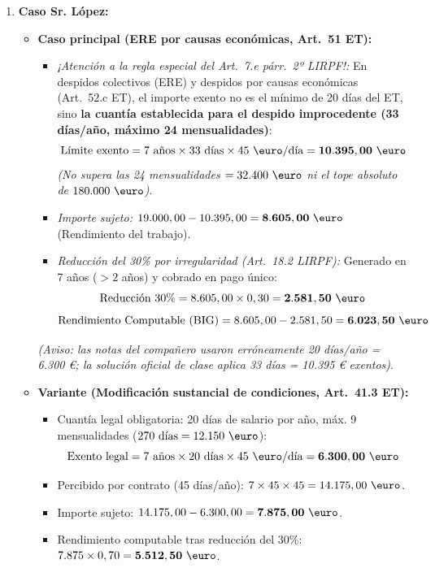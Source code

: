 \documentclass[11pt,a4paper,openany]{article}
\begin{document}
\begin{solucionBox}
\begin{enumerate}[label=\textbf{\arabic*.}]
    \item \textbf{Caso Sr. López:}
    \begin{itemize}
        \item \textbf{Caso principal (ERE por causas económicas, Art.~51 ET):}
        \begin{itemize}
            \item \textit{¡Atención a la regla especial del Art.~7.e párr.~2º LIRPF!:} En despidos colectivos (ERE) y despidos por causas económicas (Art.~52.c ET), el importe exento no es el mínimo de 20 días del ET, sino \textbf{la cuantía establecida para el despido improcedente (33 días/año, máximo 24 mensualidades)}:
            $$\text{Límite exento} = 7\text{ años} \times 33\text{ días} \times 45\text{ \euro/día} = \mathbf{10.395,00\text{ \euro}}$$
            \textit{(No supera las 24 mensualidades $= 32.400\text{ \euro}$ ni el tope absoluto de $180.000\text{ \euro}$)}.
            \item \textit{Importe sujeto:} $19.000,00 - 10.395,00 = \mathbf{8.605,00\text{ \euro}}$ (Rendimiento del trabajo).
            \item \textit{Reducción del 30\% por irregularidad (Art.~18.2 LIRPF):} Generado en 7 años ($>2$ años) y cobrado en pago único:
            $$\text{Reducción 30\%} = 8.605,00 \times 0,30 = \mathbf{2.581,50\text{ \euro}}$$
            $$\mathbf{\text{Rendimiento Computable (BIG)}} = 8.605,00 - 2.581,50 = \mathbf{6.023,50\text{ \euro}}$$
        \end{itemize}
        \textit{\small(Aviso: las notas del compañero usaron erróneamente 20 días/año = 6.300 €; la solución oficial de clase aplica 33 días = 10.395 € exentos)}.
        
        \item \textbf{Variante (Modificación sustancial de condiciones, Art.~41.3 ET):}
        \begin{itemize}
            \item Cuantía legal obligatoria: 20 días de salario por año, máx. 9 mensualidades ($270\text{ días} = 12.150\text{ \euro}$):
            $$\text{Exento legal} = 7\text{ años} \times 20\text{ días} \times 45\text{ \euro/día} = \mathbf{6.300,00\text{ \euro}}$$
            \item Percibido por contrato (45 días/año): $7 \times 45 \times 45 = 14.175,00\text{ \euro}$.
            \item Importe sujeto: $14.175,00 - 6.300,00 = \mathbf{7.875,00\text{ \euro}}$.
            \item Rendimiento computable tras reducción del 30\%: $7.875 \times 0,70 = \mathbf{5.512,50\text{ \euro}}$.
        \end{itemize}
    \end{itemize}
    

\end{enumerate}
\end{solucionBox}
\end{document}
